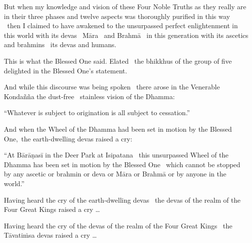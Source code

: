 \begin{english-hang}
But when my knowledge and vision of these Four Noble Truths as they really are in their three phases and twelve aspects was thoroughly purified in this way \breathmark\ then I claimed to have awakened to the unsurpassed perfect enlightenment in this world with its devas \breathmark\ Māra \breathmark\ and Brahmā \breathmark\ in this generation with its ascetics and brahmins \breathmark\ its devas and humans.
\end{english-hang}

\begin{english-hang}
This is what the Blessed One said. Elated \breathmark\ the bhikkhus of the group of five delighted in the Blessed One's statement.
\end{english-hang}

\begin{english-hang}
And while this discourse was being spoken \breathmark\ there arose in the Venerable Kondañña the dust-free \breathmark\ stainless vision of the Dhamma:
\end{english-hang}

\begin{english-hang}
``Whatever is subject to origination is all subject to cessation.''
\end{english-hang}

\begin{english-hang}
And when the Wheel of the Dhamma had been set in motion by the Blessed One, the earth-dwelling devas raised a cry:
\end{english-hang}

\begin{english-hang}
``At Bārāṇasī in the Deer Park at Isipatana \breathmark\ this unsurpassed Wheel of the Dhamma has been set in motion by the Blessed One \breathmark\ which cannot be stopped by any ascetic or brahmin or deva or Māra or Brahmā or by anyone in the world.''
\end{english-hang}

\begin{english-hang}
Having heard the cry of the earth-dwelling devas \breathmark\ the devas of the realm of the Four Great Kings raised a cry …
\end{english-hang}

\begin{english-hang}
Having heard the cry of the devas of the realm of the Four Great Kings \breathmark\ the Tāvatiṁsa devas raised a cry …
\end{english-hang}

